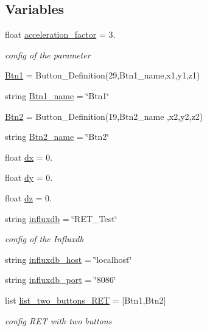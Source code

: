 \subsection*{Variables}
\begin{DoxyCompactItemize}
\item 
float \hyperlink{a00025_a425bc201cf7b10f0c4f1068f752e7c9b}{acceleration\+\_\+factor} = 3.
\begin{DoxyCompactList}\small\item\em config of the parameter \end{DoxyCompactList}\item 
\hyperlink{a00025_af037c6b9ff0314103d8127acc9d07e0b}{Btn1} = Button\+\_\+\+Definition(29,Btn1\+\_\+name,x1,y1,z1)
\item 
string \hyperlink{a00025_a96d98afcb35718dbc4c13c5bf74cfd5b}{Btn1\+\_\+name} = \char`\"{}Btn1\char`\"{}
\item 
\hyperlink{a00025_a73afa8c52cebd94e1889df5fbe3bec66}{Btn2} = Button\+\_\+\+Definition(19,Btn2\+\_\+name ,x2,y2,z2)
\item 
string \hyperlink{a00025_a9595d49d1fc79cce5a3f3af42cf8502a}{Btn2\+\_\+name} = \char`\"{}Btn2\char`\"{}
\item 
float \hyperlink{a00025_a9eae6c1f38db98ab568f3ed3771a969d}{dx} = 0.
\item 
float \hyperlink{a00025_a8f461b6142ce8725218813abb23b06a3}{dy} = 0.
\item 
float \hyperlink{a00025_a31755dd9c32708851ef90978cd814b35}{dz} = 0.
\item 
string \hyperlink{a00025_a6297da7d9cbabcbe91effb0271677ff3}{influxdb} = \char`\"{}R\+E\+T\+\_\+\+Test\char`\"{}
\begin{DoxyCompactList}\small\item\em config of the Influxdb \end{DoxyCompactList}\item 
string \hyperlink{a00025_a5ad590543d5ae7b0a89b3681d33928d8}{influxdb\+\_\+host} = \char`\"{}localhost\char`\"{}
\item 
string \hyperlink{a00025_a91cab5b28cd6867b74e2cb9f887b2948}{influxdb\+\_\+port} = \char`\"{}8086\char`\"{}
\item 
list \hyperlink{a00025_aceb7d96541943b4a77c54516a2be88d2}{list\+\_\+two\+\_\+buttons\+\_\+\+R\+ET} = \mbox{[}Btn1,Btn2\mbox{]}
\begin{DoxyCompactList}\small\item\em config R\+ET with two buttons \end{DoxyCompactList}\item 

\end{DoxyCompactItemize}
